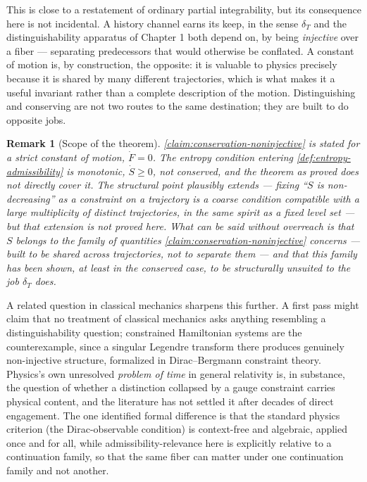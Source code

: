 \documentclass[12pt]{report}
\newtheorem{remark}[definition]{Remark}
\begin{document}
This is close to a restatement of ordinary partial integrability, but
its consequence here is not incidental. A history channel earns its
keep, in the sense $\delta_T$ and the distinguishability apparatus of
Chapter 1 both depend on, by being \emph{injective} over a fiber ---
separating predecessors that would otherwise be conflated. A constant of
motion is, by construction, the opposite: it is valuable to physics
precisely because it is shared by many different trajectories, which is
what makes it a useful invariant rather than a complete description of
the motion. Distinguishing and conserving are not two routes to the
same destination; they are built to do opposite jobs.

\begin{remark}[Scope of the theorem]
\label{rem:monotonic-not-conserved}
\cref{claim:conservation-noninjective} is stated for a strict constant of
motion, $\dot{F} = 0$. The entropy condition entering
\cref{def:entropy-admissibility} is monotonic, $\dot{S} \geq 0$, not
conserved, and the theorem as proved does not directly cover it. The
structural point plausibly extends --- fixing ``$S$ is non-decreasing''
as a constraint on a trajectory is a coarse condition compatible with a
large multiplicity of distinct trajectories, in the same spirit as a
fixed level set --- but that extension is not proved here. What can be
said without overreach is that $S$ belongs to the family of quantities
\cref{claim:conservation-noninjective} concerns --- built to be shared
across trajectories, not to separate them --- and that this family has
been shown, at least in the conserved case, to be structurally unsuited
to the job $\delta_T$ does.
\end{remark}

A related question in classical mechanics sharpens this further. A
first pass might claim that no treatment of classical mechanics asks
anything resembling a distinguishability question; constrained
Hamiltonian systems are the counterexample, since a singular Legendre
transform there produces genuinely non-injective structure, formalized
in Dirac--Bergmann constraint theory. Physics's own unresolved
\emph{problem of time} in general relativity is, in substance, the
question of whether a distinction collapsed by a gauge constraint
carries physical content, and the literature has not settled it after
decades of direct engagement. The one identified formal difference is
that the standard physics criterion (the Dirac-observable condition) is
context-free and algebraic, applied once and for all, while
admissibility-relevance here is explicitly relative to a continuation
family, so that the same fiber can matter under one continuation family
and not another.
\end{document}
